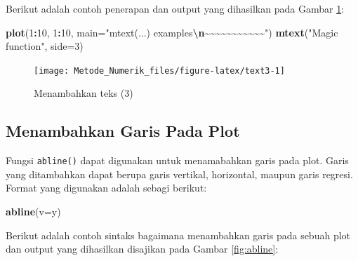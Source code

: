 \documentclass[
]{book}
\newenvironment{Shaded}{\begin{snugshade}}{\end{snugshade}}
\newcommand{\AttributeTok}[1]{\textcolor[rgb]{0.13,0.29,0.53}{#1}}
\newcommand{\DecValTok}[1]{\textcolor[rgb]{0.00,0.00,0.81}{#1}}
\newcommand{\FunctionTok}[1]{\textcolor[rgb]{0.13,0.29,0.53}{\textbf{#1}}}
\newcommand{\NormalTok}[1]{#1}
\newcommand{\SpecialCharTok}[1]{\textcolor[rgb]{0.81,0.36,0.00}{\textbf{#1}}}
\newcommand{\StringTok}[1]{\textcolor[rgb]{0.31,0.60,0.02}{#1}}
\theoremstyle{definition}
\theoremstyle{definition}
\theoremstyle{definition}
\theoremstyle{definition}
\theoremstyle{remark}
\begin{document}
Berikut adalah contoh penerapan dan output yang dihasilkan pada Gambar \ref{fig:text3}:

\begin{Shaded}
\begin{Highlighting}[]
\FunctionTok{plot}\NormalTok{(}\DecValTok{1}\SpecialCharTok{:}\DecValTok{10}\NormalTok{, }\DecValTok{1}\SpecialCharTok{:}\DecValTok{10}\NormalTok{, }
     \AttributeTok{main=}\StringTok{"mtext(...) examples}\SpecialCharTok{\textbackslash{}n}\StringTok{\textasciitilde{}\textasciitilde{}\textasciitilde{}\textasciitilde{}\textasciitilde{}\textasciitilde{}\textasciitilde{}\textasciitilde{}\textasciitilde{}\textasciitilde{}\textasciitilde{}"}\NormalTok{)}
\FunctionTok{mtext}\NormalTok{(}\StringTok{"Magic function"}\NormalTok{, }\AttributeTok{side=}\DecValTok{3}\NormalTok{)}
\end{Highlighting}
\end{Shaded}

\begin{figure}

{\centering \texttt{[image: Metode\_Numerik\_files/figure-latex/text3-1]} 

}

\caption{Menambahkan teks (3)}\label{fig:text3}
\end{figure}

\hypertarget{addlines}{%
\subsection{Menambahkan Garis Pada Plot}\label{addlines}}

Fungsi \texttt{abline()} dapat digunakan untuk menamabahkan garis pada plot. Garis yang ditambahkan dapat berupa garis vertikal, horizontal, maupun garis regresi. Format yang digunakan adalah sebagi berikut:

\begin{Shaded}
\begin{Highlighting}[]
\FunctionTok{abline}\NormalTok{(}\AttributeTok{v=}\NormalTok{y)}
\end{Highlighting}
\end{Shaded}

Berikut adalah contoh sintaks bagaimana menambahkan garis pada sebuah plot dan output yang dihasilkan disajikan pada Gambar \ref{fig:abline}:
\end{document}
